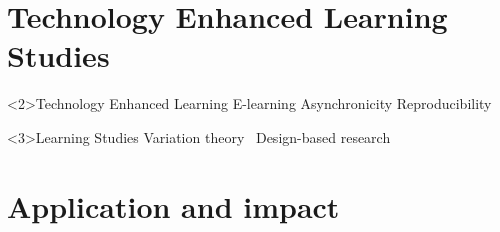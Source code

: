 \mode*

\section{Technology Enhanced Learning Studies}

\begin{frame}
  \begin{block}<2>{Technology Enhanced Learning}
    \hitem E-learning
    \qquad
    \hitem Asynchronicity
    \qquad
    \hitem Reproducibility
  \end{block}

  \begin{center}
    \Large
  \end{center}

  \begin{block}<3>{Learning Studies}
    \hitem Variation theory~\cite{VariationTheory}
    \qquad
    \hitem Design-based research~\cite{DesignBasedResearch}
  \end{block}
\end{frame}

\section{Application and impact}

